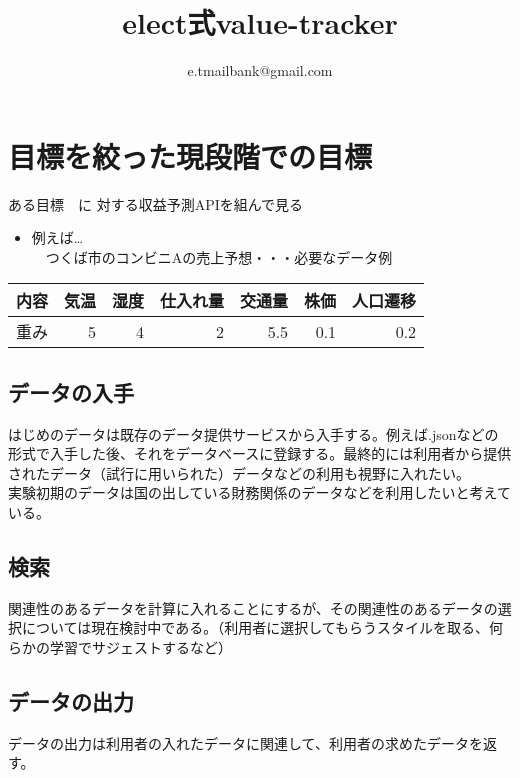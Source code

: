 \documentclass{scrartcl}
\author{e.tmailbank@gmail.com}
\date{}
\title{elect式value-tracker}
\begin{document}
\maketitle
\section{目標を絞った現段階での目標}
\label{sec:orgb6da1d8}
ある目標　に 対する収益予測APIを組んで見る\\
\begin{itemize}
\item 例えば\ldots{}\\
　つくば市のコンビニAの売上予想・・・必要なデータ例\\
\end{itemize}
\begin{center}
\begin{tabular}{lrrrrrr}
\hline
内容 & 気温 & 湿度 & 仕入れ量 & 交通量 & 株価 & 人口遷移\\
\hline
重み & 5 & 4 & 2 & 5.5 & 0.1 & 0.2\\
\hline
\end{tabular}
\end{center}
\subsection{データの入手}
\label{sec:orga27f3f7}
はじめのデータは既存のデータ提供サービスから入手する。例えば.jsonなどの形式で入手した後、それをデータベースに登録する。最終的には利用者から提供されたデータ（試行に用いられた）データなどの利用も視野に入れたい。\\
実験初期のデータは国の出している財務関係のデータなどを利用したいと考えている。\\
\subsection{検索}
\label{sec:orgfd2a23f}
関連性のあるデータを計算に入れることにするが、その関連性のあるデータの選択については現在検討中である。（利用者に選択してもらうスタイルを取る、何らかの学習でサジェストするなど）\\
\subsection{データの出力}
\label{sec:org451d131}
データの出力は利用者の入れたデータに関連して、利用者の求めたデータを返す。\\
\end{document}
